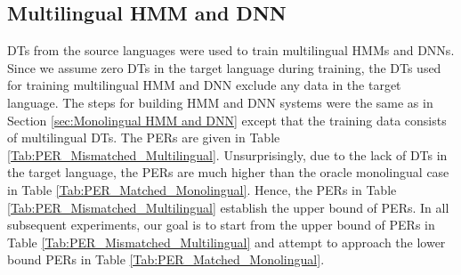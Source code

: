 \documentclass[a4paper]{article}
\begin{document}
\subsection{Multilingual HMM and DNN}
\label{sec:Multilingual HMM and DNN}
DTs from the source languages were used to train multilingual HMMs and DNNs. Since we assume zero DTs in the target language during training, the DTs used for training multilingual HMM and DNN exclude any data in the target language. The steps for building HMM and DNN systems were the same as in Section \ref{sec:Monolingual HMM and DNN} except that the training data consists of multilingual DTs. The PERs are given in Table \ref{Tab:PER_Mismatched_Multilingual}. Unsurprisingly, due to the lack of DTs in the target language, the PERs are much higher than the oracle monolingual case in Table \ref{Tab:PER_Matched_Monolingual}. Hence, the PERs in Table \ref{Tab:PER_Mismatched_Multilingual} establish the upper bound of PERs. In all subsequent experiments, our goal is to start from the upper bound of PERs in Table \ref{Tab:PER_Mismatched_Multilingual} and attempt to approach the lower bound PERs in Table \ref{Tab:PER_Matched_Monolingual}. 
\end{document}
